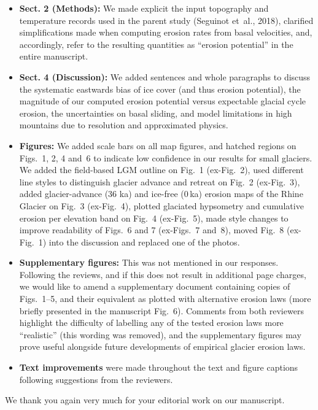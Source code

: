     \begin{itemize}

        \item \textbf{Sect. 2 (Methods):}
        We made explicit the input topography and temperature records used in
        the parent study (Seguinot et~al., 2018), clarified simplifications
        made when computing erosion rates from basal velocities, and,
        accordingly, refer to the resulting quantities as ``erosion potential''
        in the entire manuscript.

        \item \textbf{Sect. 4 (Discussion):}
        We added sentences and whole paragraphs to discuss the systematic
        eastwards bias of ice cover (and thus erosion potential), the magnitude
        of our computed erosion potential versus expectable glacial cycle
        erosion, the uncertainties on basal sliding, and model limitations in
        high mountains due to resolution and approximated physics.

        \item \textbf{Figures:}
        We added scale bars on all map figures, and hatched regions on Figs.~1,
        2, 4 and~6 to indicate low confidence in our results for small
        glaciers. We added the field-based LGM outline on Fig.~1 (ex-Fig.~2),
        used different line styles to distinguish glacier advance and retreat
        on Fig.~2 (ex-Fig.~3), added glacier-advance (36 ka) and ice-free
        (0\,ka) erosion maps of the Rhine Glacier on Fig.~3 (ex-Fig.~4),
        plotted glaciated hypsometry and cumulative erosion per elevation band
        on Fig.~4 (ex-Fig.~5), made style changes to improve readability of
        Figs.~6 and 7 (ex-Figs.~7 and~8), moved Fig.~8 (ex-Fig.~1) into the
        discussion and replaced one of the photos.

        \item \textbf{Supplementary figures:}
        This was not mentioned in our responses. Following the reviews, and
        if this does not result in additional page charges, we would like to
        amend a supplementary document containing copies of Figs.~1--5, and
        their equivalent as plotted with alternative erosion laws (more
        briefly presented in the manuscript Fig.~6). Comments from both
        reviewers highlight the difficulty of labelling any of the tested
        erosion laws more ``realistic'' (this wording was removed), and the
        supplementary figures may prove useful alongside future developments of
        empirical glacier erosion laws.

        \item \textbf{Text improvements}
        were made throughout the text and figure captions following suggestions
        from the reviewers.

    \end{itemize}

    We thank you again very much for your editorial work on our manuscript.


